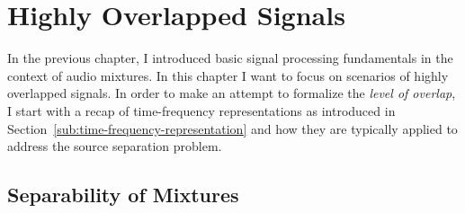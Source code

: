 \hypertarget{highly-overlapped-signals}{%
\chapter{Highly Overlapped Signals}\label{highly-overlapped-signals}}

In the previous chapter, I introduced basic signal processing fundamentals in the context of audio mixtures.
In this chapter I want to focus on scenarios of highly overlapped signals.
In order to make an attempt to formalize the \emph{level of overlap}, I start with a recap of time-frequency representations as introduced in Section~\ref{sub:time-frequency-representation} and how they are typically applied to address the source separation problem.

\hypertarget{separability-of-mixtures}{%
\section{Separability of Mixtures}\label{separability-of-mixtures}}

